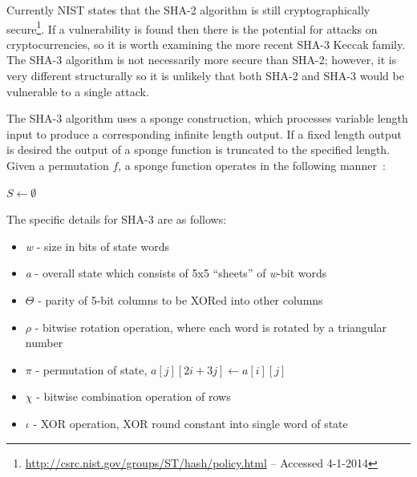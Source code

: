 \documentclass[11pt]{article}
\begin{document}
Currently NIST states that the SHA-2 algorithm is still cryptographically
secure\footnote{\url{http://csrc.nist.gov/groups/ST/hash/policy.html} -- Accessed 4-1-2014}. If a vulnerability is found
then there is the potential for attacks on cryptocurrencies, so it is worth examining the more recent SHA-3 Keccak
family. The SHA-3 algorithm is not necessarily more secure than SHA-2; however, it is very different structurally so it
is unlikely that both SHA-2 and SHA-3 would be vulnerable to a single attack.

The SHA-3 algorithm uses a sponge construction, which processes variable length input to produce a corresponding
infinite length output. If a fixed length output is desired the output of a sponge function is truncated to the
specified length. Given a permutation $f$, a sponge function operates in the following manner~\cite{bertoni07}:
\vspace{1em}\\
\begin{algorithm}[H]
    $S \gets \emptyset$ \\
\end{algorithm}

The specific details for SHA-3 are as follows\cite{sha3}:
\begin{itemize}
    \item \emph{w} - size in bits of state words
    \item \emph{a} - overall state which consists of 5x5 ``sheets'' of \emph{w}-bit words
    \item $\Theta$ - parity of 5-bit columns to be XORed into other columns
    \item $\rho$ - bitwise rotation operation, where each word is rotated by a triangular number
    \item $\pi$ - permutation of state, $a[j][2i+3j] \leftarrow a[i][j]$
    \item $\chi$ - bitwise combination operation of rows
    \item $\iota$ - XOR operation, XOR round constant into single word of state
\end{itemize}
\end{document}
